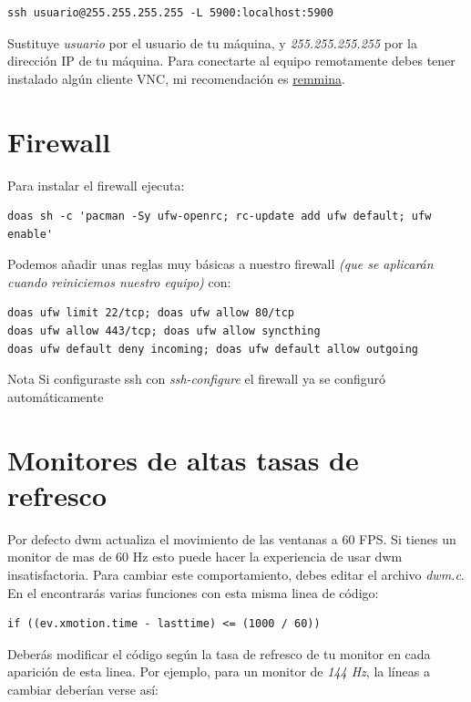 \documentclass[11pt]{article}
\begin{document}
\begin{verbatim}
ssh usuario@255.255.255.255 -L 5900:localhost:5900
\end{verbatim}

Sustituye \emph{usuario} por el usuario de tu máquina, y \emph{255.255.255.255} por la dirección IP de tu máquina. Para conectarte al equipo remotamente debes tener instalado algún cliente VNC, mi recomendación es \href{https://github.com/FreeRDP/Remmina}{remmina}.

\section{Firewall}

Para instalar el firewall ejecuta:

\begin{verbatim}
doas sh -c 'pacman -Sy ufw-openrc; rc-update add ufw default; ufw enable'
\end{verbatim}

Podemos añadir unas reglas muy básicas a nuestro firewall \emph{(que se aplicarán cuando reiniciemos nuestro equipo)} con:

\begin{verbatim}
doas ufw limit 22/tcp; doas ufw allow 80/tcp
doas ufw allow 443/tcp; doas ufw allow syncthing
doas ufw default deny incoming; doas ufw default allow outgoing
\end{verbatim}

\begin{mybox}{Nota}
Si configuraste ssh con \emph{ssh-configure} el firewall ya se configuró automáticamente
\end{mybox}

\section{Monitores de altas tasas de refresco}

Por defecto dwm actualiza el movimiento de las ventanas a 60 FPS. Si tienes un monitor de mas de 60 Hz esto puede hacer la experiencia de usar dwm insatisfactoria. Para cambiar este comportamiento, debes editar el archivo \emph{dwm.c}. En el encontrarás varias funciones con esta misma linea de código:

\begin{verbatim}
if ((ev.xmotion.time - lasttime) <= (1000 / 60))
\end{verbatim}

Deberás modificar el código según la tasa de refresco de tu monitor en cada aparición de esta linea. Por ejemplo, para un monitor de \emph{144 Hz}, la líneas a cambiar deberían verse así:
\end{document}
